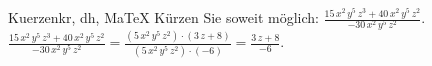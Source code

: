\begin{MAufgabe}{Kuerzen}{kr, dh, MaTeX}
K\"urzen Sie soweit m\"oglich: $\frac{15\, x^2\, y^5\, z^3 + 40\, x^2\, y^5\, z^2}{- 30\, x^2\, y^5\, z^2}$.\\ 
\ifLsg\MLoesung
\quad $\frac{15\, x^2\, y^5\, z^3 + 40\, x^2\, y^5\, z^2}{- 30\, x^2\, y^5\, z^2}=\frac{(5\, x^2\, y^5\, z^2)\cdot(3\, z + 8)}{(5\, x^2\, y^5\, z^2)\cdot(-6)}=\frac{3\, z + 8}{-6}$.\else\relax\fi
 \end{MAufgabe}